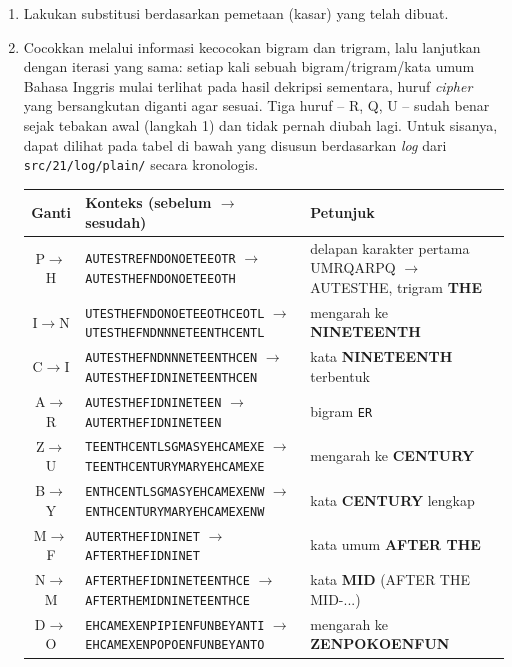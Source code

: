 \begin{enumerate}
  \item Lakukan substitusi berdasarkan pemetaan (kasar) yang telah dibuat.

  \item Cocokkan melalui informasi kecocokan bigram dan trigram, lalu
  lanjutkan dengan iterasi yang sama: setiap kali sebuah bigram/trigram/kata
  umum Bahasa Inggris mulai terlihat pada hasil dekripsi sementara, huruf
  \textit{cipher} yang bersangkutan diganti agar sesuai. Tiga huruf -- R, Q, U -- sudah benar sejak tebakan awal
  (langkah 1) dan tidak pernah diubah lagi. Untuk sisanya, dapat dilihat pada tabel di bawah
  yang disusun berdasarkan \textit{log} dari \texttt{src/21/log/plain/} secara kronologis.

  \begin{center}
    \footnotesize
    \begin{tabular}{|c|p{7.2cm}|p{5.3cm}|}
      \hline
      Ganti & Konteks (sebelum $\to$ sesudah) & Petunjuk \\
      \hline
      P$\to$H & \texttt{AUTESTREFNDONOETEEOTR} $\to$ \texttt{AUTESTHEFNDONOETEEOTH} & delapan karakter pertama UMRQARPQ $\to$ AUTESTHE, trigram \textbf{THE} \\
      \hline
      I$\to$N & \texttt{UTESTHEFNDONOETEEOTHCEOTL} $\to$ \texttt{UTESTHEFNDNNNETEENTHCENTL} & mengarah ke \textbf{NINETEENTH} \\
      \hline
      C$\to$I & \texttt{AUTESTHEFNDNNNETEENTHCEN} $\to$ \texttt{AUTESTHEFIDNINETEENTHCEN} & kata \textbf{NINETEENTH} terbentuk \\
      \hline
      A$\to$R & \texttt{AUTESTHEFIDNINETEEN} $\to$ \texttt{AUTERTHEFIDNINETEEN} & bigram \texttt{ER} \\
      \hline
      Z$\to$U & \texttt{TEENTHCENTLSGMASYEHCAMEXE} $\to$ \texttt{TEENTHCENTURYMARYEHCAMEXE} & mengarah ke \textbf{CENTURY} \\
      \hline
      B$\to$Y & \texttt{ENTHCENTLSGMASYEHCAMEXENW} $\to$ \texttt{ENTHCENTURYMARYEHCAMEXENW} & kata \textbf{CENTURY} lengkap \\
      \hline
      M$\to$F & \texttt{AUTERTHEFIDNINET} $\to$ \texttt{AFTERTHEFIDNINET} & kata umum \textbf{AFTER THE} \\
      \hline
      N$\to$M & \texttt{AFTERTHEFIDNINETEENTHCE} $\to$ \texttt{AFTERTHEMIDNINETEENTHCE} & kata \textbf{MID} (AFTER THE MID-...) \\
      \hline
      D$\to$O & \texttt{EHCAMEXENPIPIENFUNBEYANTI} $\to$ \texttt{EHCAMEXENPOPOENFUNBEYANTO} & mengarah ke \textbf{ZENPOKOENFUN} \\

\end{tabular}
\end{center}
\end{enumerate}

